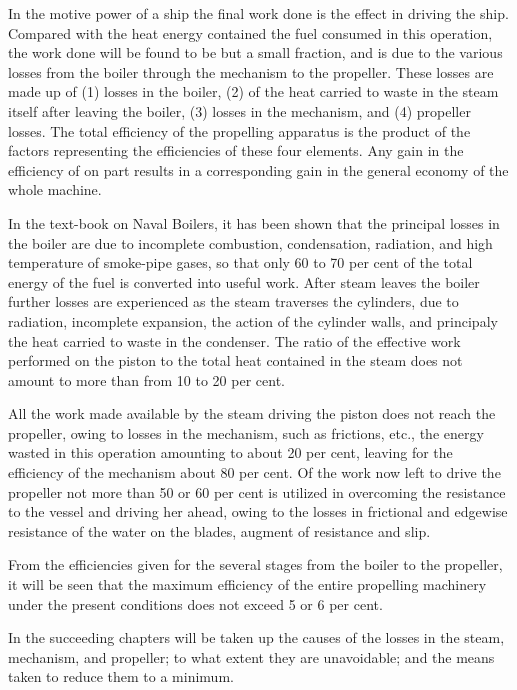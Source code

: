 \documentclass[11pt, a5paper]{book}
\begin{document}
In the motive power of a ship the final work done is the effect in
driving the ship.  Compared with the heat energy contained the fuel
consumed in this operation, the work done will be found to be but a
small fraction, and is due to the various losses from the boiler
through the mechanism to the propeller.  These losses are made up of
(1) losses in the boiler, (2) of the heat carried to waste in the
steam itself after leaving the boiler, (3) losses in the mechanism,
and (4) propeller losses.  The total efficiency of the propelling
apparatus is the product of the factors representing the efficiencies
of these four elements.  Any gain in the efficiency of on part results
in a corresponding gain in the general economy of the whole
machine.\par

In the text-book on Naval Boilers, it has been shown that the
principal losses in the boiler are due to incomplete combustion,
condensation, radiation, and high temperature of smoke-pipe gases, so
that only 60 to 70 per cent of the total energy of the fuel is
converted into useful work.  After steam leaves the boiler further
losses are experienced as the steam traverses the cylinders, due to
radiation, incomplete expansion, the action of the cylinder walls, and
principaly the heat carried to waste in the condenser.  The ratio of
the effective work performed on the piston to the total heat contained
in the steam does not amount to more than from 10 to 20 per cent.\par

All the work made available by the steam driving the piston does not
reach the propeller, owing to losses in the mechanism, such as
frictions, etc., the energy wasted in this operation amounting to
about 20 per cent, leaving for the efficiency of the mechanism about
80 per cent.  Of the work now left to drive the propeller not more
than 50 or 60 per cent is utilized in overcoming the resistance to the
vessel and driving her ahead, owing to the losses in frictional and
edgewise resistance of the water on the blades, augment of resistance
and slip.\par

From the efficiencies given for the several stages from the boiler to
the propeller, it will be seen that the maximum efficiency of the
entire propelling machinery under the present conditions does not
exceed 5 or 6 per cent.\par

In the succeeding chapters will be taken up the causes of the losses
in the steam, mechanism, and propeller; to what extent they are
unavoidable; and the means taken to reduce them to a minimum.\par
\end{document}
